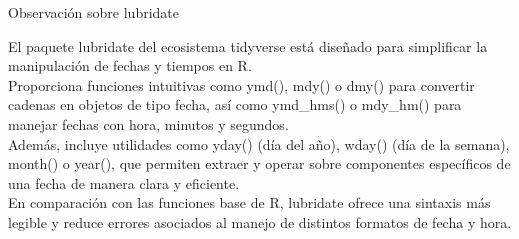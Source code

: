 \documentclass[
]{book}
\begin{document}
{} Observación sobre lubridate

El paquete lubridate del ecosistema tidyverse está diseñado para
simplificar la manipulación de fechas y tiempos en R.\\
Proporciona funciones intuitivas como ymd(), mdy() o dmy()
para convertir cadenas en objetos de tipo fecha, así como ymd\_hms() o mdy\_hm()
para manejar fechas con hora, minutos y segundos.\\
Además, incluye utilidades como yday() (día del año), wday() (día de la semana),
month() o year(), que permiten extraer y operar sobre componentes específicos de una fecha
de manera clara y eficiente.\\
En comparación con las funciones base de R, lubridate ofrece una sintaxis más legible y reduce errores
asociados al manejo de distintos formatos de fecha y hora.
\end{document}

